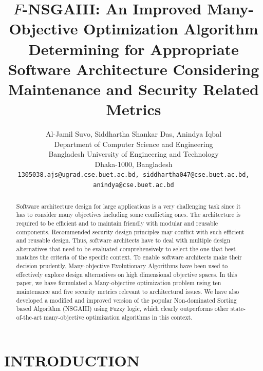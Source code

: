 \documentclass[letterpaper, 10 pt, conference]{ieeeconf}  %
\title{\LARGE \bf
$F$-NSGAIII: An Improved Many-Objective Optimization Algorithm Determining for Appropriate Software Architecture Considering Maintenance and Security Related Metrics
}
\author{ \parbox{7 in}{\centering Al-Jamil Suvo, Siddhartha Shankar Das, Anindya Iqbal\\        
        Department of Computer Science and Engineering\\
        Bangladesh University of Engineering and Technology\\
        Dhaka-1000, Bangladesh\\
        {\tt\small 1305038.ajs@ugrad.cse.buet.ac.bd, siddhartha047@cse.buet.ac.bd, anindya@cse.buet.ac.bd}} 
}
\begin{document}
\maketitle
\thispagestyle{empty}
\pagestyle{empty}


\begin{abstract} 
Software architecture design for large applications is a very challenging task since it has to consider many objectives including some conflicting ones. The architecture is required to be efficient and to maintain friendly with modular and reusable components. Recommended security design principles may conflict with such efficient and reusable design. Thus, software architects have to deal with multiple design alternatives that need to be evaluated comprehensively to select the one that best matches the criteria of the specific context. To enable software architects make their decision prudently, Many-objective Evolutionary Algorithms have been used to effectively explore design alternatives on high dimensional objective spaces. In this paper, we have formulated a Many-objective optimization problem using ten maintenance and five security metrics relevant to architectural issues. We have also developed a modified and improved version of the popular Non-dominated Sorting based Algorithm (NSGAIII) using Fuzzy logic, which clearly outperforms other state-of-the-art many-objective optimization algorithms in this context.

\end{abstract}


\section{INTRODUCTION}
\end{document}
